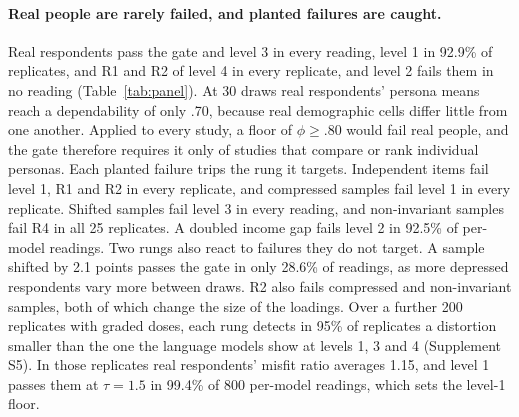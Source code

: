 \paragraph{Real people are rarely failed, and planted failures are caught.}
Real respondents pass the gate and level 3 in every reading, level 1 in 92.9\% of replicates, and R1 and R2 of level 4 in every replicate, and level 2 fails them in no reading (Table~\ref{tab:panel}). %
At 30 draws real respondents' persona means reach a dependability of only .70, because real demographic cells differ little from one another. %
Applied to every study, a floor of $\phi \ge .80$ would fail real people, and the gate therefore requires it only of studies that compare or rank individual personas.
Each planted failure trips the rung it targets. %
Independent items fail level 1, R1 and R2 in every replicate, and compressed samples fail level 1 in every replicate. %
Shifted samples fail level 3 in every reading, and non-invariant samples fail R4 in all 25 replicates. %
A doubled income gap fails level 2 in 92.5\% of per-model readings. %
Two rungs also react to failures they do not target.
A sample shifted by 2.1 points passes the gate in only 28.6\% of readings, as more depressed respondents vary more between draws. %
R2 also fails compressed and non-invariant samples, both of which change the size of the loadings.
Over a further 200 replicates with graded doses, each rung detects in 95\% of replicates a distortion smaller than the one the language models show at levels 1, 3 and 4 (Supplement S5).
In those replicates real respondents' misfit ratio averages 1.15, and level 1 passes them at $\tau = 1.5$ in 99.4\% of 800 per-model readings, which sets the level-1 floor. %

